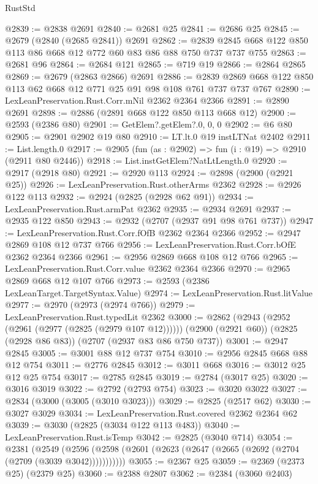 \begin{lexlean}{RustStd}
\begin{coremodule}
@2839 := @2838 @2691
@2840 := @2681 @25
@2841 := @2686 @25
@2845 := @2679 (@2840 (@2685 @2841)) @2691
@2862 := @2839 @2845 @668 @122 @850 @113 @86 @668 @12 @772 @60 @83 @86 @88 @750 @737 @737 @755
@2863 := @2681 @96
@2864 := @2684 @121
@2865 := @719 @19
@2866 := @2864 @2865
@2869 := @2679 (@2863 @2866) @2691
@2886 := @2839 @2869 @668 @122 @850 @113 @62 @668 @12 @771 @25 @91 @98 @108 @761 @737 @737 @767
@2890 := LexLeanPreservation.Rust.Corr.mNil @2362 @2364 @2366
@2891 := @2890 @2691
@2898 := @2886 (@2891 @668 @122 @850 @113 @668 @12)
@2900 := @2593 (@2386 @80)
@2901 := GetElem?.getElem?.{0, 0, 0}
@2902 := @6 @80
@2905 := @2901 @2902 @19 @80
@2910 := LT.lt.{0} @19 instLTNat @2402
@2911 := List.length.{0}
@2917 := @2905 (fun (as : @2902) => fun (i : @19) => @2910 (@2911 @80 @2446))
@2918 := List.instGetElem?NatLtLength.{0}
@2920 := @2917 (@2918 @80)
@2921 := @2920 @113
@2924 := @2898 (@2900 (@2921 @25))
@2926 := LexLeanPreservation.Rust.otherArms @2362
@2928 := @2926 @122 @113
@2932 := @2924 (@2825 (@2928 @62 @91))
@2934 := LexLeanPreservation.Rust.armPat @2362
@2935 := @2934 @2691
@2937 := @2935 @122 @850
@2943 := @2932 (@2707 (@2937 @91 @98 @761 @737))
@2947 := LexLeanPreservation.Rust.Corr.fOfB @2362 @2364 @2366
@2952 := @2947 @2869 @108 @12 @737 @766
@2956 := LexLeanPreservation.Rust.Corr.bOfE @2362 @2364 @2366
@2961 := @2956 @2869 @668 @108 @12 @766
@2965 := LexLeanPreservation.Rust.Corr.value @2362 @2364 @2366
@2970 := @2965 @2869 @668 @12 @107 @766
@2973 := @2593 (@2386 LexLeanTarget.TargetSyntax.Value)
@2974 := LexLeanPreservation.Rust.litValue
@2977 := @2970 (@2973 (@2974 @766))
@2979 := LexLeanPreservation.Rust.typedLit @2362
@3000 := @2862
    (@2943 (@2952 (@2961 (@2977 (@2825 (@2979 @107 @12))))))
    (@2900 (@2921 @60))
    (@2825 (@2928 @86 @83))
    (@2707 (@2937 @83 @86 @750 @737))
@3001 := @2947 @2845
@3005 := @3001 @88 @12 @737 @754
@3010 := @2956 @2845 @668 @88 @12 @754
@3011 := @2776 @2845
@3012 := @3011 @668
@3016 := @3012 @25 @12 @25 @754
@3017 := @2785 @2845
@3019 := @2784 (@3017 @25)
@3020 := @3016 @3019
@3022 := @2792 (@2793 @754)
@3023 := @3020 @3022
@3027 := @2834 (@3000 (@3005 (@3010 @3023)))
@3029 := @2825 (@2517 @62)
@3030 := @3027 @3029
@3034 := LexLeanPreservation.Rust.covered @2362 @2364 @62
@3039 := @3030 (@2825 (@3034 @122 @113 @483))
@3040 := LexLeanPreservation.Rust.isTemp
@3042 := @2825 (@3040 @714)
@3054 := @2381
    (@2549 (@2596 (@2598 (@2601 (@2623 (@2647 (@2665 (@2692 (@2704 (@2709 (@3039 @3042)))))))))))
@3055 := @2367 @25
@3059 := @2369 (@2373 @25) (@2379 @25)
@3060 := @2388 @2807
@3062 := @2384 (@3060 @2403)

\end{coremodule}
\end{lexlean}
